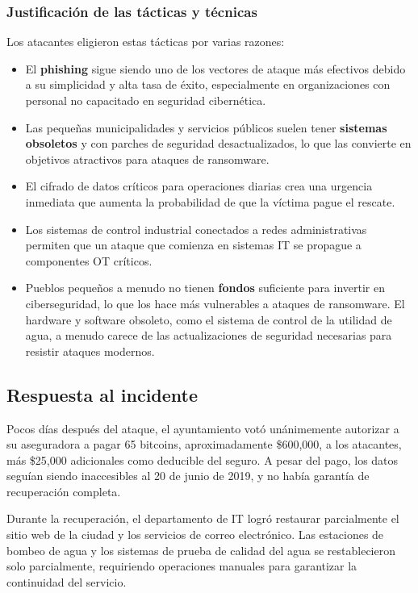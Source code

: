 \subsubsection{Justificación de las tácticas y técnicas}
Los atacantes eligieron estas tácticas por varias razones:

\begin{itemize}
    \item El \textbf{phishing} sigue siendo uno de los vectores de ataque más efectivos debido a su simplicidad y alta tasa de éxito, especialmente en organizaciones con personal no capacitado en seguridad cibernética.
    
    \item Las pequeñas municipalidades y servicios públicos suelen tener \textbf{sistemas obsoletos} y con parches de seguridad desactualizados, lo que las convierte en objetivos atractivos para ataques de ransomware.
    
    \item El cifrado de datos críticos para operaciones diarias crea una urgencia inmediata que aumenta la probabilidad de que la víctima pague el rescate.
    
    \item Los sistemas de control industrial conectados a redes administrativas permiten que un ataque que comienza en sistemas \textsc{IT} se propague a componentes \textsc{OT} críticos.
    
    \item Pueblos pequeños a menudo no tienen \textbf{fondos} suficiente para invertir en ciberseguridad, lo que los hace más vulnerables a ataques de ransomware.
    El hardware y software obsoleto, como el sistema de control de la utilidad de agua, a menudo carece de las actualizaciones de seguridad necesarias para resistir ataques modernos.
\end{itemize}



\subsection{Respuesta al incidente}
Pocos días después del ataque, el ayuntamiento votó unánimemente autorizar a su aseguradora a pagar 65 bitcoins, aproximadamente \$600,000, a los atacantes, más \$25,000 adicionales como deducible del seguro. A pesar del pago, los datos seguían siendo inaccesibles al 20 de junio de 2019, y no había garantía de recuperación completa.

Durante la recuperación, el departamento de \textsc{IT} logró restaurar parcialmente el sitio web de la ciudad y los servicios de correo electrónico. Las estaciones de bombeo de agua y los sistemas de prueba de calidad del agua se restablecieron solo parcialmente, requiriendo operaciones manuales para garantizar la continuidad del servicio.

